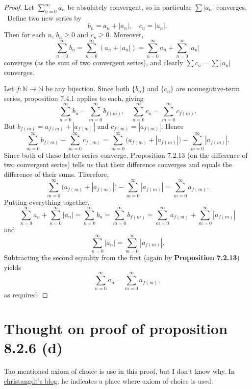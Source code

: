\documentclass{article}
\begin{document}
\begin{proof}
    Let $\sum_{n=0}^\infty a_n$ be absolutely convergent, so in particular $\sum |a_n|$ converges. \
    Define two new series by
    \[
        b_n = a_n + |a_n|, \quad c_n = |a_n|.
    \]
    Then for each \( n \), \( b_n \geq 0 \) and \( c_n \geq 0 \).
    Moreover,
    \[
        \sum_{n=0}^\infty b_n = \sum_{n=0}^\infty (a_n + |a_n|) = \sum_{n=0}^\infty a_n + \sum_{n=0}^\infty |a_n|
    \]
    converges (as the sum of two convergent series), and clearly \( \sum c_n = \sum |a_n| \) converges.

    Let \( f: \mathbb{N} \to \mathbb{N} \) be any bijection.
    Since both \( \{b_n\} \) and \( \{c_n\} \) are nonnegative-term series,
    proposition 7.4.1 applies to each, giving
    \[
        \sum_{n=0}^\infty b_n = \sum_{m=0}^\infty b_{f(m)}, \quad \sum_{n=0}^\infty c_n = \sum_{m=0}^\infty c_{f(m)}.
    \]
    But \( b_{f(m)} = a_{f(m)} + |a_{f(m)}| \) and \( c_{f(m)} = |a_{f(m)}| \).
    Hence
    \[
        \sum_{m=0}^\infty b_{f(m)} - \sum_{m=0}^\infty c_{f(m)} = \sum_{m=0}^\infty \bigl(a_{f(m)} + |a_{f(m)}|\bigr) - \sum_{m=0}^\infty |a_{f(m)}|.
    \]
    Since both of these latter series converge,
    Proposition 7.2.13 (on the difference of two convergent series)
    tells us that their difference converges and equals the difference of their sums.
    Therefore,
    \[
        \sum_{m=0}^\infty \bigl(a_{f(m)} + |a_{f(m)}|\bigr) - \sum_{m=0}^\infty |a_{f(m)}| = \sum_{m=0}^\infty a_{f(m)}.
    \]
    Putting everything together,
    \[
        \sum_{n=0}^\infty a_n + \sum_{n=0}^\infty |a_n| = \sum_{n=0}^\infty b_n = \sum_{m=0}^\infty b_{f(m)} = \sum_{m=0}^\infty a_{f(m)} + \sum_{m=0}^\infty |a_{f(m)}|
    \]
    and
    \[
        \sum_{n=0}^\infty |a_n| = \sum_{m=0}^\infty |a_{f(m)}|.
    \]
    Subtracting the second equality from the first (again by \textbf{Proposition 7.2.13}) yields
    \[
        \sum_{n=0}^\infty a_n = \sum_{m=0}^\infty a_{f(m)},
    \]
    as required.
\end{proof}

\section{Thought on proof of proposition 8.2.6 (d)}
Tao mentioned axiom of choice is use in this proof, but I don't know why.
In \href{https://christangdt.home.blog/2019/04/29/243/}{christangdt's blog},
he indicates a place where axiom of choice is used.
\end{document}
